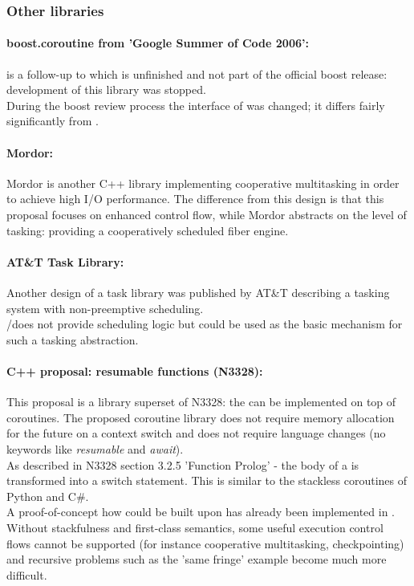 \subsubsection*{Other libraries}
\paragraph*{boost.coroutine from 'Google Summer of Code 2006':}
\boostcoroutine is a follow-up to \boostcorosum which is unfinished and
not part of the official boost release: development of this library was
stopped.\\
During the boost review process the interface of \boostcoroutine was changed; it
differs fairly significantly from \boostcorosum.

\paragraph*{Mordor:}
Mordor\cite{mordor} is another C++ library implementing cooperative multitasking
in order to achieve high I/O performance. The difference from this design is that
this proposal focuses on enhanced control flow, while Mordor\cite{mordor} abstracts
on the level of tasking: providing a cooperatively scheduled fiber engine.

\paragraph*{AT\&T Task Library:}
Another design of a task library was published by AT\&T\cite{atnt1989}
describing a tasking system with non-preemptive scheduling.\\
\pushcoro/\pullcoro does not provide scheduling logic but could be used as the
basic mechanism for such a tasking abstraction.

\paragraph*{C++ proposal: resumable functions (N3328\cite{n3328}):}
This proposal is a library superset of N3328: the \resumfn can be implemented
on top of coroutines. The proposed coroutine library does not require memory allocation
for the future on a context switch and does not require language changes (no keywords
like \textit{resumable} and \textit{await}).\\
As described in N3328 section 3.2.5 'Function Prolog' - the body of a \resumfn is
transformed into a switch statement. This is similar to the stackless coroutines
of Python and C\#.\\
A proof-of-concept how \await could be built upon \boostcoroutine has already been
implemented in \awaitemu.\\
\newline
Without stackfulness and first-class semantics, some useful execution control
flows cannot be supported (for instance cooperative multitasking,
checkpointing) and recursive problems such as the 'same fringe' example become
much more difficult.
